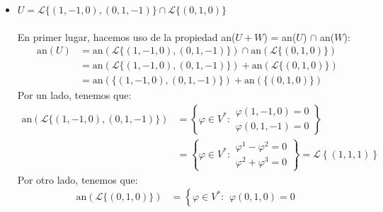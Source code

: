 \begin{ejercicio}
\begin{itemize}
\begin{align*}
\begin{array}{cc}
					x+y = 0 \\
					z-t = 0
				\end{array}\right\}
			\end{align*}
		\item[\textit{c})] $U=\mathcal{L}\{(1,-1,0),(0,1,-1)\} \cap \mathcal{L}\{(0,1,0)\}$ \\ \\
			En primer lugar, hacemos uso de la propiedad an($U + W$) = an($U$) $\cap$ an($W$):
			\begin{align*}
				\text{an}(U) & = \text{an}(\mathcal{L}\{(1,-1,0),(0,1,-1)\}) \cap \text{an}(\mathcal{L}\{(0,1,0)\}) \\
				             & = \text{an}(\mathcal{L}\{(1,-1,0),(0,1,-1)\}) + \text{an}(\mathcal{L}\{(0,1,0)\})    \\
				             & = \text{an}(\{(1,-1,0),(0,1,-1)\}) + \text{an}(\{(0,1,0)\})
			\end{align*}
			Por un lado, tenemos que:
			\begin{align*}
				\text{an}(\mathcal{L}\{(1,-1,0),(0,1,-1)\}) & = \left\{ \varphi \in V^{*} : \begin{array}{ll}
					                                                                            \varphi(1,-1,0) = 0 \\
					                                                                            \varphi(0,1,-1) = 0
				                                                                            \end{array}\right\}                                      \\
				                                            & = \left\{ \varphi \in V^{*} : \begin{array}{ll}
					                                                                            \varphi^1 - \varphi^2  = 0 \\
					                                                                            \varphi^2 + \varphi^3 = 0
				                                                                            \end{array}\right\} = \mathcal{L}\left\{ (1,1,1)\right\}
			\end{align*}
			Por otro lado, tenemos que:
			\begin{align*}
				\text{an}(\mathcal{L}\{(0,1,0)\}) & = \left\{ \varphi \in V^{*} : \begin{array}{ll}
					                                                                  \varphi(0,1,0) = 0

\end{array}
\end{align*}
\end{itemize}
\end{ejercicio}
